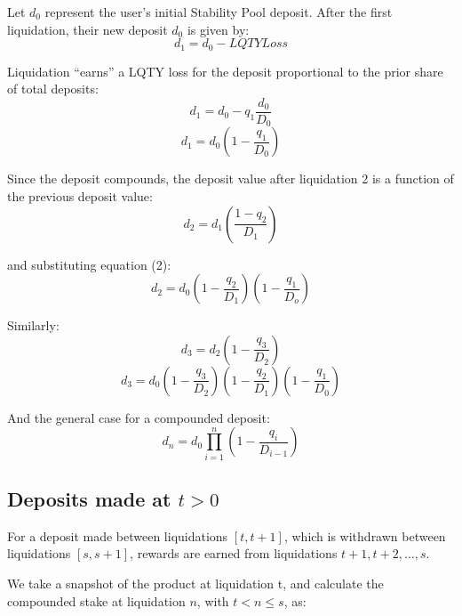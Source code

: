 \documentclass[reqno]{article}
\begin{document}
\bigskip
Let $d_0$ represent the user’s initial Stability Pool deposit. After the first liquidation, their new
deposit $d_0$ is given by:\\
\begin{equation} 
    d_1=d_0-LQTYLoss
\end{equation}

\bigskip
Liquidation “earns” a LQTY loss for the deposit proportional to the prior share of total deposits:
\begin{equation} 
    d_1=d_0-q_1\frac{d_0}{D_0}
\end{equation}
\begin{equation} 
    d_1=d_0\left(1-\frac{q_1}{D_0}\right)
\end{equation}

\bigskip
Since the deposit compounds, the deposit value after liquidation 2 is a function of the previous deposit value:
\begin{equation} 
    d_2=d_1\left(\frac{1-q_2}{D_1}\right)
\end{equation}

\bigskip
and substituting equation (2):
\begin{equation} 
    d_2=d_0 \left(1-\frac{q_2}{D_1}\right) \left(1-\frac{q_1}{D_o} \right)
\end{equation}

\bigskip
Similarly:
\begin{equation} 
    d_3=d_2\left(1-\frac{q_3}{D_2}\right)
\end{equation}
\begin{equation} 
    d_3=d_0\left(1-\frac{q_3}{D_2}\right)\left(1-\frac{q_2}{D_1}\right)\left(1-\frac{q_1}{D_0}\right)
\end{equation}

\bigskip
And the general case for a compounded deposit:
\begin{equation} 
    d_n=d_0\prod^n_{i=1}{\left(1-\frac{q_i}{D_{i-1}}\right)}
\end{equation}
\subsection{Deposits made at $t>0$}
For a deposit made between liquidations $[t, t+1]$, which is withdrawn between liquidations $[s, s+1]$, rewards are earned from liquidations $t+1, t+2, \ldots, s$.

We take a snapshot of the product at liquidation t, and calculate the compounded stake at liquidation $n$, with $t < n \leq s$, as:
\end{document}
